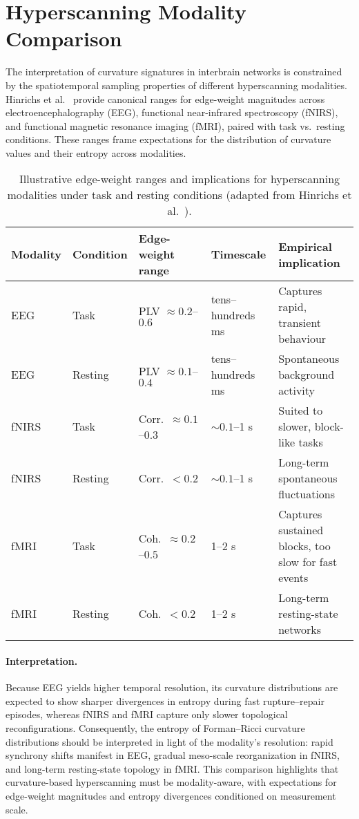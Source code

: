 \documentclass{article}
\theoremstyle{definition}
\begin{document}
\section{Hyperscanning Modality Comparison}

The interpretation of curvature signatures in interbrain networks is constrained
by the spatiotemporal sampling properties of different hyperscanning modalities.
Hinrichs et al.~\cite{hinrichs2025geometry} provide canonical ranges for
edge-weight magnitudes across electroencephalography (EEG), functional near-infrared
spectroscopy (fNIRS), and functional magnetic resonance imaging (fMRI), paired
with task vs.\ resting conditions. These ranges frame expectations for the
distribution of curvature values and their entropy across modalities.

\begin{table}[H]
\centering
\caption{Illustrative edge-weight ranges and implications for hyperscanning modalities under task and resting conditions (adapted from Hinrichs et al.~\cite{hinrichs2025geometry}).}
\label{tab:modality-comparison}
\begin{tabularx}{\textwidth}{@{}p{1.5cm} p{1.8cm} p{2.5cm} p{2cm} X@{}}
\toprule
\textbf{Modality} & \textbf{Condition} & \textbf{Edge-weight range} & \textbf{Timescale} & \textbf{Empirical implication} \\
\midrule
EEG   & Task    & PLV $\approx 0.2$--$0.6$ & tens--hundreds ms & Captures rapid, transient behaviour \\
EEG   & Resting & PLV $\approx 0.1$--$0.4$ & tens--hundreds ms & Spontaneous background activity \\
\addlinespace
fNIRS & Task    & Corr.\ $\approx 0.1$--$0.3$ & $\sim 0.1$--1 s & Suited to slower, block-like tasks \\
fNIRS & Resting & Corr.\ $< 0.2$ & $\sim 0.1$--1 s & Long-term spontaneous fluctuations \\
\addlinespace
fMRI  & Task    & Coh.\ $\approx 0.2$--$0.5$ & 1--2 s & Captures sustained blocks, too slow for fast events \\
fMRI  & Resting & Coh.\ $< 0.2$ & 1--2 s & Long-term resting-state networks \\
\bottomrule
\end{tabularx}
\end{table}

\paragraph{Interpretation.}
Because EEG yields higher temporal resolution, its curvature distributions are
expected to show sharper divergences in entropy during fast rupture--repair
episodes, whereas fNIRS and fMRI capture only slower topological reconfigurations.
Consequently, the entropy of Forman--Ricci curvature distributions should be
interpreted in light of the modality’s resolution: rapid synchrony shifts
manifest in EEG, gradual meso-scale reorganization in fNIRS, and long-term
resting-state topology in fMRI. This comparison highlights that curvature-based
hyperscanning must be modality-aware, with expectations for edge-weight
magnitudes and entropy divergences conditioned on measurement scale.
\end{document}
